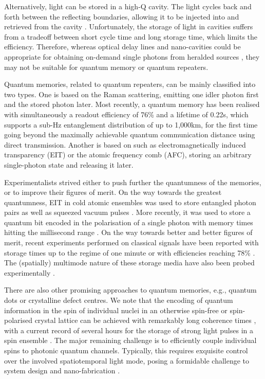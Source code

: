 Alternatively, light can be stored in a high-Q cavity. The light cycles back and forth between the reflecting boundaries, allowing it to be injected into and retrieved from the cavity \cite{bib:pittman2002single, bib:pittman2002cyclical, bib:leung2006quantum, bib:maitre1997quantum, bib:tanabe2007trapping, bib:tanabe2009dynamic}. Unfortunately, the storage of light in cavities suffers from a tradeoff between short cycle time and long storage time, which limits the efficiency. Therefore, whereas optical delay lines and nano-cavities could be appropriate for obtaining on-demand single photons from heralded sources \cite{bib:saglamyurek2015quantum, bib:jin2015telecom}, they may not be suitable for quantum memory or quantum repeaters.

Quantum memories, related to quantum repeaters, can be mainly classified into two types. One is based on the Raman scattering, emitting one idler photon first and the stored photon later. Most recently, a quantum memory has been realised with simultaneously a readout efficiency of 76\% and a lifetime of 0.22s, which supports a sub-Hz entanglement distribution of up to 1,000km, for the first time going beyond the maximally achievable quantum communication distance using direct transmission. Another is based on such as electromagnetically induced transparency (EIT) or the atomic frequency comb (AFC), storing an arbitrary single-photon state and releasing it later.

Experimentalists strived either to push further the quantumness of the memories, or to improve their figures of merit. On the way towards the greatest quantumness, EIT in cold atomic ensembles was used to store entangled photon pairs \cite{bib:Choi2008mapping} as well as squeezed vacuum pulses \cite{bib:appel2008quantum, bib:honda2008storage}. More recently, it was used to store a quantum bit encoded in the polarisation of a single photon with memory times hitting the millisecond range \cite{bib:lettner2011remote, bib:riedl2012bose, bib:xu2013long}. On the way towards better and better figures of merit, recent experiments performed on classical signals have been reported with storage times up to the regime of one minute \cite{bib:heinze2013stopped} or with efficiencies reaching 78\% \cite{bib:chen2013coherent}. The (spatially) multimode nature of these storage media have also been probed experimentally \cite{bib:ding2013single}.

There are also other promising approaches to quantum memories, e.g., quantum dots or crystalline defect centres. We note that the encoding of quantum information in the spin of individual nuclei in an otherwise spin-free or spin-polarised crystal lattice can be achieved with remarkably long coherence times \cite{bib:steger2012quantum, bib:saeedi2013room}, with a current record of several hours for the storage of strong light pulses in a spin ensemble \cite{bib:zhong2015optically}. The major remaining challenge is to efficiently couple individual spins to photonic quantum channels. Typically, this requires exquisite control over the involved spatiotemporal light mode, posing a formidable challenge to system design and nano-fabrication \cite{bib:reiserer2015cavity}.

